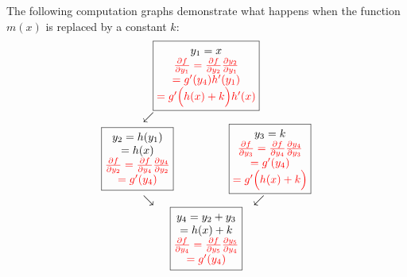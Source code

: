 The following computation graphs demonstrate what happens when the function $m(x)$ is replaced by a constant $k$:
\begin{equation*}
    \begin{matrix}
    \begin{matrix}
        \boxed{\begin{matrix}
            y_1=x \\
            \color{red}{\frac{\partial f}{\partial y_1} = \frac{\partial f}{\partial y_2}\frac{\partial y_2}{\partial y_1}} \\
            \color{red}{= g'(y_4)h'(y_1)} \\
            \color{red}{= g'\Bigl(h(x) + k\Bigr)h'(x)}
        \end{matrix}} \\
        \begin{matrix}
            \swarrow \\
            \boxed{\begin{matrix}
                y_2=h(y_1) \\
                =h(x) \\
                \color{red}{\frac{\partial f}{\partial y_2} = \frac{\partial f}{\partial y_4}\frac{\partial y_4}{\partial y_2}} \\
                \color{red}{= g'(y_4)}
            \end{matrix}} \qquad & \qquad
            \boxed{\begin{matrix}
                y_3=k \\
                \color{red}{\frac{\partial f}{\partial y_3} = \frac{\partial f}{\partial y_4}\frac{\partial y_4}{\partial y_3}} \\
                \color{red}{= g'(y_4)} \\
                \color{red}{= g'\Bigl(h(x) + k\Bigr)}
            \end{matrix}} \\
            \searrow & \swarrow \\
        \end{matrix} \\
        \boxed{\begin{matrix}
            y_4 = y_2+y_3 \\
            = h(x) + k \\
            \color{red}{\frac{\partial f}{\partial y_4} = \frac{\partial f}{\partial y_5}\frac{\partial y_5}{\partial y_4}} \\
            \color{red}{= g'(y_4)}

\end{matrix}}
\end{matrix}
\end{matrix}
\end{equation*}
